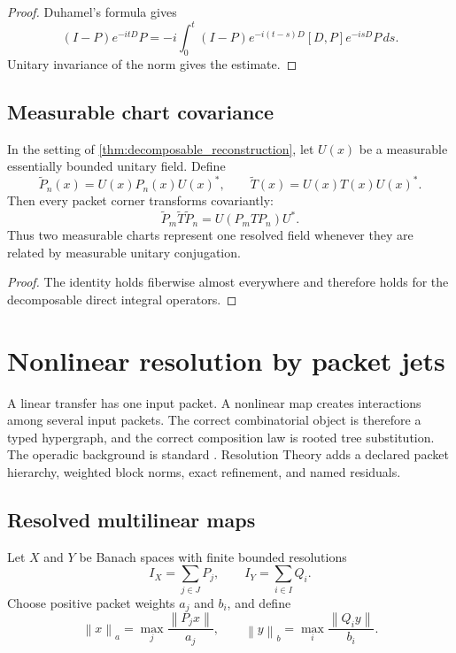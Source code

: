 \documentclass{aomart}
\theoremstyle{definition}
\theoremstyle{remark}
\newcommand{\norm}[1]{\left\lVert#1\right\rVert}
\newcommand{\Rcite}[1]{\cite{#1}}
\begin{document}
\begin{proof}
Duhamel's formula gives
\[
 (I-P)e^{-itD}P
 =
 -i\int_0^t
 (I-P)e^{-i(t-s)D}[D,P]e^{-isD}P\,ds.
\]
Unitary invariance of the norm gives the estimate.
\end{proof}

\subsection{Measurable chart covariance}

\begin{proposition}\label{prop:measurable_covariance}
In the setting of \cref{thm:decomposable_reconstruction}, let \(U(x)\) be a measurable essentially bounded unitary field. Define
\[
 \widetilde P_n(x)=U(x)P_n(x)U(x)^*,
 \qquad
 \widetilde T(x)=U(x)T(x)U(x)^*.
\]
Then every packet corner transforms covariantly:
\[
 \boxed{
 \widetilde P_m\widetilde T\widetilde P_n
 =
 U(P_mTP_n)U^*.
 }
\]
Thus two measurable charts represent one resolved field whenever they are related by measurable unitary conjugation.
\end{proposition}

\begin{proof}
The identity holds fiberwise almost everywhere and therefore holds for the decomposable direct integral operators.
\end{proof}

\section{Nonlinear resolution by packet jets}\label{sec:nonlinear}

A linear transfer has one input packet. A nonlinear map creates interactions among several input packets. The correct combinatorial object is therefore a typed hypergraph, and the correct composition law is rooted tree substitution. The operadic background is standard \Rcite{R14}. Resolution Theory adds a declared packet hierarchy, weighted block norms, exact refinement, and named residuals.

\subsection{Resolved multilinear maps}

Let \(X\) and \(Y\) be Banach spaces with finite bounded resolutions
\[
 I_X=\sum_{j\in J}P_j,
 \qquad
 I_Y=\sum_{i\in I}Q_i.
\]
Choose positive packet weights \(a_j\) and \(b_i\), and define
\[
 \norm{x}_a
 =
 \max_j\frac{\norm{P_jx}}{a_j},
 \qquad
 \norm{y}_b
 =
 \max_i\frac{\norm{Q_iy}}{b_i}.
\]
\end{document}
